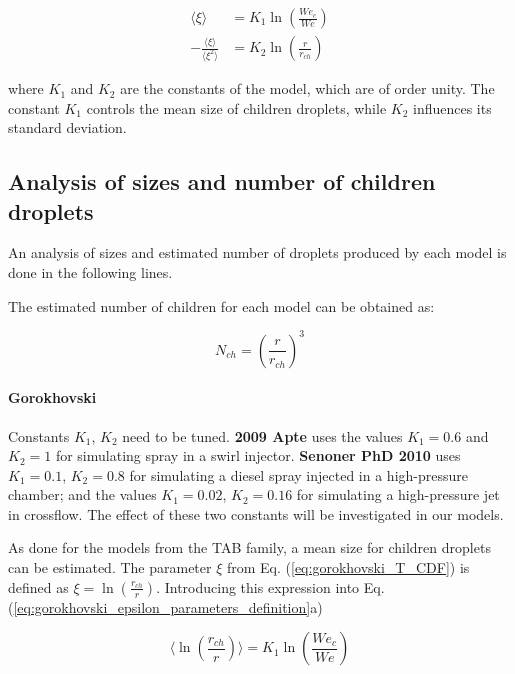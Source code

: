 \begin{subequations}
\label{eq:gorokhovski_epsilon_parameters_definition}
\begin{align}
\langle \xi \rangle &=  K_1 \ln \left(  \frac{We_c}{We}  \right) \\
- \frac{\langle \xi \rangle}{\langle \xi^2 \rangle} &=  K_2 \ln \left( \frac{r}{r_{ch}} \right)
\end{align}
\end{subequations}

where $K_1$ and $K_2$ are the constants of the model, which are of order unity. The constant $K_1$ controls the mean size of children droplets, while $K_2$ influences its standard deviation.






\subsection{Analysis of sizes and number of children droplets}

An analysis of sizes and estimated number of droplets produced by each model is done in the following lines.

The estimated number of children for each model can be obtained as:

\begin{equation}
N_{ch} = \left( \frac{r}{r_{ch}} \right)^3
\end{equation}

\paragraph{Gorokhovski} Constants $K_1$, $K_2$ need to be tuned. \textbf{2009 Apte} uses the values $K_1 = 0.6$ and $K_2 = 1$ for simulating spray in a swirl injector. \textbf{Senoner PhD 2010} uses $K_1 = 0.1$, $K_2 = 0.8$ for simulating a diesel spray injected in a high-pressure chamber; and the values  $K_1 = 0.02$, $K_2 = 0.16$ for simulating a high-pressure jet in crossflow. The effect of these two constants will be investigated in our models.

As done for the models from the TAB family, a mean size for children droplets can be estimated. The parameter $\xi$ from Eq. (\ref{eq:gorokhovski_T_CDF}) is defined as $\xi = \ln \left( \frac{r_{ch}}{r}  \right)$. Introducing this expression into Eq. (\ref{eq:gorokhovski_epsilon_parameters_definition}a) 

\begin{equation}
\langle \ln \left( \frac{r_{ch}}{r}  \right) \rangle = K_1  \ln \left(  \frac{We_c}{We}  \right) 
\end{equation}

